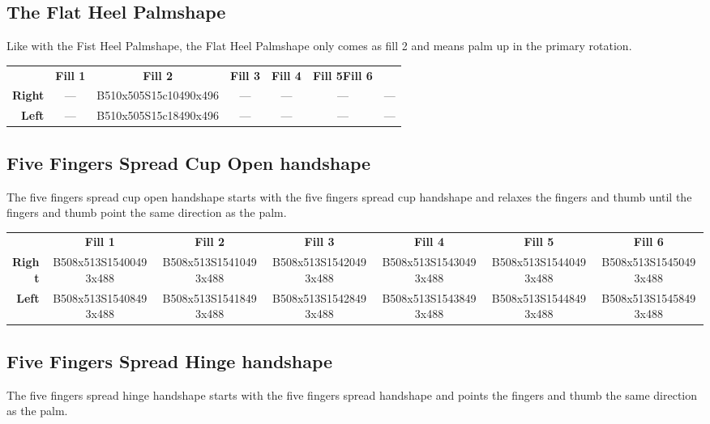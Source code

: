 \documentclass{article}
\begin{document}
\subsection{The Flat Heel Palmshape}

Like with the Fist Heel Palmshape, the Flat Heel Palmshape only comes as fill 2 and means palm up in the primary rotation.

\begin{center}
\begin{tabular}{r*{6}{c}}
&\textbf{Fill 1}&\textbf{Fill 2}&\textbf{Fill 3}&\textbf{Fill 4}&\textbf{Fill 5}\textbf{Fill 6}\\
\textbf{Right}&---&B510x505S15c10490x496&---&---&---&---\\
\textbf{Left} &---&B510x505S15c18490x496&---&---&---&---\\
\end{tabular}
\end{center}

\subsection{Five Fingers Spread Cup Open handshape}

The five fingers spread cup open handshape starts with the five fingers spread cup handshape and relaxes the fingers and thumb until the fingers and thumb point the same direction as the palm.

\begin{center}
\begin{tabular}{r*{6}{c}}
&\textbf{Fill 1}&\textbf{Fill 2}&\textbf{Fill 3}&\textbf{Fill 4}&\textbf{Fill 5}&\textbf{Fill 6}\\
\textbf{Right}&
B508x513S15400493x488&
B508x513S15410493x488&
B508x513S15420493x488&
B508x513S15430493x488&
B508x513S15440493x488&
B508x513S15450493x488\\
\textbf{Left}&
B508x513S15408493x488&
B508x513S15418493x488&
B508x513S15428493x488&
B508x513S15438493x488&
B508x513S15448493x488&
B508x513S15458493x488\\
\end{tabular}
\end{center}

\subsection{Five Fingers Spread Hinge handshape}

The five fingers spread hinge handshape starts with the five fingers spread handshape and points the fingers and thumb the same direction as the palm.
\end{document}
